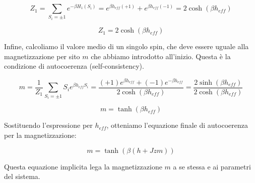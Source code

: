\begin{equation} \label{eq:ch16_37}
Z_1 = \sum_{S_i = \pm 1} e^{-\beta H_1(S_i)} = e^{\beta h_{eff}(+1)} + e^{\beta h_{eff}(-1)} = 2 \cosh(\beta h_{eff})
\end{equation}

\begin{equation} \label{eq:ch16_38}
Z_1 =  2 \cosh(\beta h_{eff})
\end{equation}

Infine, calcoliamo il valore medio di un singolo spin, che deve essere uguale alla magnetizzazione per sito $m$ che abbiamo introdotto all'inizio. Questa è la condizione di autocoerenza (self-consistency).

\begin{equation} \label{eq:ch16_39}
m  = \frac{1}{Z_1} \sum_{S_i = \pm 1} S_i e^{\beta h_{eff} S_i} = \frac{(+1)e^{\beta h_{eff}} + (-1)e^{-\beta h_{eff}}}{2 \cosh(\beta h_{eff})} = \frac{2 \sinh(\beta h_{eff})}{2 \cosh(\beta h_{eff})}
\end{equation}

\begin{equation} \label{eq:ch16_40}
m = \tanh(\beta h_{eff})
\end{equation}

Sostituendo l'espressione per $h_{eff}$, otteniamo l'equazione finale di autocoerenza per la magnetizzazione:

\begin{equation} \label{eq:ch16_41}
m = \tanh(\beta (h + Jzm))
\end{equation}

Questa equazione implicita lega la magnetizzazione $m$ a se stessa e ai parametri del sistema.

